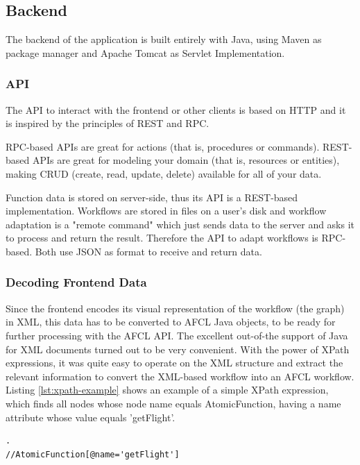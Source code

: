 \documentclass[a4paper,12pt,pdftex,halfparskip,cleardoubleempty,bibtotoc,liststotoc]{scrbook}
\begin{document}
\subsection{Backend}

The backend  of the application is built entirely with Java, using Maven as package manager and Apache Tomcat as Servlet Implementation.

\subsubsection{API}
 
The API to interact with the frontend or other clients is based on HTTP and it is inspired by the principles of REST and RPC.

RPC-based APIs are great for actions (that is, procedures or commands).
REST-based APIs are great for modeling your domain (that is, resources or entities), making CRUD (create, read, update, delete) available for all of your data. \cite{online-smashingmagazine-rest-vs-rpc}

Function data is stored on server-side, thus its API is a REST-based implementation. Workflows are stored in files on a user's disk and workflow adaptation is a "remote command" which just sends data to the server and asks it to process and return the result. Therefore the API to adapt workflows is RPC-based. Both use JSON as format to receive and return data.

\subsubsection{Decoding Frontend Data}
\label{sec:backend-decoding}

Since the frontend encodes its visual representation of the workflow (the graph) in XML, this data has to be converted to AFCL Java objects, to be ready for further processing with the AFCL API. 
The excellent out-of-the support of Java for XML documents turned out to be very convenient. With the power of XPath expressions, it was quite easy to operate on the XML structure and extract the relevant information to convert the XML-based workflow into an AFCL workflow. Listing \ref{lst:xpath-example} shows an example of a simple XPath expression, which finds all nodes whose node name equals \textsf{AtomicFunction}, having a \textsf{name} attribute whose value equals 'getFlight'.\\

\begin{lstlisting}[caption={Example of an XPath expression.},label={lst:xpath-example}].
//AtomicFunction[@name='getFlight']
\end{lstlisting}
\end{document}
